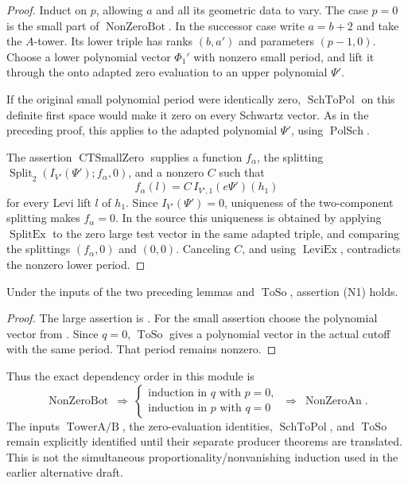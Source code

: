\begin{proof}
Induct on \(p\), allowing \(a\) and all its geometric data to vary.
The case \(p=0\) is the small part of
\(\operatorname{NonZeroBot}\).
In the successor case write \(a=b+2\) and take the
\(A\)-tower. Its lower triple has ranks \((b,a')\)
and parameters \((p-1,0)\).
Choose a lower polynomial vector \(\Phi_1'\)
with nonzero small period, and lift it through the
onto adapted zero evaluation to an upper polynomial
\(\Psi'\).

If the original small polynomial period were identically zero,
\(\operatorname{SchToPol}\) on this definite first space would
make it zero on every Schwartz vector.
As in the preceding proof, this applies to the adapted
polynomial \(\Psi'\), using \(\operatorname{PolSch}\).

The assertion \(\operatorname{CTSmallZero}\) supplies a function
\(f_\alpha\), the splitting
\(\operatorname{Split}_2(I_{V'}(\Psi');f_\alpha,0)\),
and a nonzero \(C\) such that
\[
             f_\alpha(l)=C\,I_{V',1}(e\Psi')(h_1)
\]
for every Levi lift \(l\) of \(h_1\).
Since \(I_{V'}(\Psi')=0\), uniqueness of the two-component
splitting makes \(f_\alpha=0\).
In the source this uniqueness is obtained by applying
\(\operatorname{SplitEx}\) to the zero large test vector
in the same adapted triple, and comparing the splittings
\((f_\alpha,0)\) and \((0,0)\).
Canceling \(C\), and using \(\operatorname{LeviEx}\),
contradicts the nonzero lower period.
\end{proof}

\begin{srproposition}
\label{prop:sr-source-nonzeroAn}
Under the inputs of the two preceding lemmas and
\(\operatorname{ToSo}\), assertion (N1) holds.
\end{srproposition}

\begin{proof}
The large assertion is .
For the small assertion choose the polynomial vector from
. Since \(q=0\),
\(\operatorname{ToSo}\) gives a polynomial vector in the
actual cutoff with the same period.
That period remains nonzero.
\end{proof}

Thus the exact dependency order in this module is
\[
 \operatorname{NonZeroBot}
 \ \Longrightarrow\
 \begin{cases}
   \text{induction in }q\text{ with }p=0,\\
   \text{induction in }p\text{ with }q=0
 \end{cases}
 \ \Longrightarrow\ \operatorname{NonZeroAn}.
\]
The inputs \(\operatorname{TowerA/B}\), the zero-evaluation
identities, \(\operatorname{SchToPol}\), and
\(\operatorname{ToSo}\) remain explicitly identified until
their separate producer theorems are translated.
This is not the simultaneous proportionality/nonvanishing
induction used in the earlier alternative draft.
